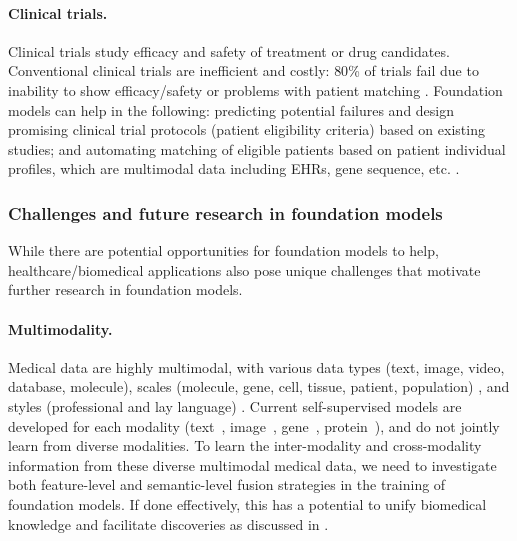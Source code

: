 \paragraph{Clinical trials.}
Clinical trials study efficacy and safety of treatment or drug candidates.
Conventional clinical trials are inefficient and costly: $80$\% of trials fail due to inability to show efficacy/safety or problems with patient matching \citep{ali2020virtual,liu2021evaluating}.
Foundation models can help in the following: predicting potential failures and design promising clinical trial protocols (\eg patient eligibility criteria) based on existing studies; and automating matching of eligible patients based on patient individual profiles, which are multimodal data including EHRs, gene sequence, etc. \citep{harrer2019artificial}.



\subsubsection{Challenges and future research in foundation models}
\label{sec:healthcare-biomed-challenge}

While there are potential opportunities for foundation models to help, healthcare/biomedical applications also pose unique challenges that motivate further research in foundation models. 

\paragraph{Multimodality.}
Medical data are highly multimodal, with various data types (text, image, video, database, molecule), scales (molecule, gene, cell, tissue, patient, population) \citep{kong2011integrative,ruiz2020identification}, and styles (professional and lay language) \citep{lavertu2019redmed,li2019neural}. Current self-supervised models are developed for each modality (\eg text~\citep{lee2020biobert}, image~\citep{chaitanya2020contrastive}, gene~\citep{ji2021dnabert}, protein~\citep{jumper2020high}), and do not jointly learn from diverse modalities.
To learn the inter-modality and cross-modality information  from these diverse multimodal medical data, we need to investigate both feature-level and semantic-level fusion strategies in the training of foundation models.
If done effectively, this has a potential to unify biomedical knowledge and facilitate discoveries as discussed in .

